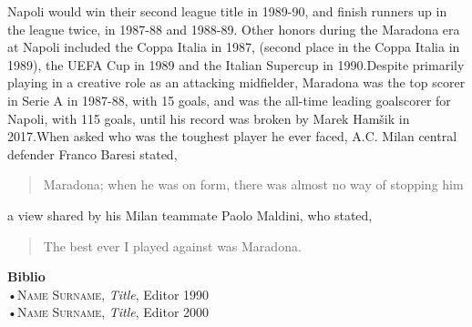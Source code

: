 \documentclass[oneside]{article}
\begin{document}
\begin{multicols*}{2}
 
Napoli would win their second league title in 1989-90, and finish runners up in the league twice, in 1987-88 and 1988-89. Other honors during the Maradona era at Napoli included the Coppa Italia in 1987, (second place in the Coppa Italia in 1989), the UEFA Cup in 1989 and the Italian Supercup in 1990.Despite primarily playing in a creative role as an attacking midfielder, Maradona was the top scorer in Serie A in 1987-88, with 15 goals, and was the all-time leading goalscorer for Napoli, with 115 goals, until his record was broken by Marek Ham\v{s}ik in 2017.When asked who was the toughest player he ever faced, A.C. Milan central defender Franco Baresi stated, 
\begin{quote}
Maradona; when he was on form, there was almost no way of stopping him
\end {quote} 
a view shared by his Milan teammate Paolo Maldini, who stated, 
\begin{quote}
The best ever I played against was Maradona.
\end{quote}

\vspace{1cm}

\textbf{\textsf {Biblio}}\\
•\textsc{\textsf {Name Surname}}, \emph{Title}, Editor 1990\\
•\textsc{\textsf {Name Surname}}, \emph{Title}, Editor 2000\\





\end{multicols*}
\end{document}
